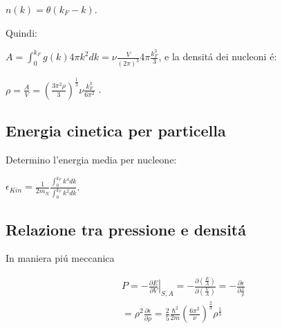 \documentclass[main.tex]{subfiles}
\newcommand{\mblock}[1]{ {\allowbreak $#1$ }}
\begin{document}
 $n(k)=\theta (k_F-k)$. 
 
 Quindi:
 
 $A=\int_0^{k_F}g(k)4\pi k^2dk=\nu \frac{V}{(2\pi)^3}4\pi \frac{k_F^3}{3}$, e la densit\'a dei nucleoni \'e:
 
\mblock{\rho =\frac{A}{V}=(\frac{3\pi^2\rho}{3})^{\frac{1}{3}}\nu \frac{k_F^3}{6\pi^2}}.



\subsection{Energia cinetica per particella}
Determino l'energia media per nucleone:

$\epsilon_{Kin}=\frac{1}{2m_N}\frac{\int_0^{k_F}k^4dk}{\int_0^{k_F}k^2dk}$.


\subsection{Relazione tra pressione e densit\'a}


In maniera pi\'u meccanica 

\begin{align*}
&P=-\left.\frac{\partial E}{\partial V} \right|_{S,A}=-\frac{\partial (\frac{E}{A})}{\partial (\frac{V}{A})}=-\frac{\partial \epsilon}{\partial \frac{1}{\rho}}\\
&=\rho^2 \frac{\partial \epsilon}{\partial \rho}=\frac{2}{5}\frac{\hbar^2}{2m}(\frac{6\pi^2}{\nu})^{\frac{2}{3}}\rho^\frac{5}{3}
\end{align*}
\end{document}
